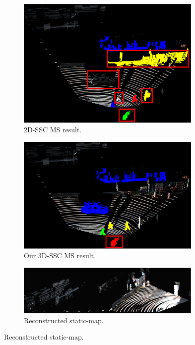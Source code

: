 \documentclass[10pt,twocolumn,letterpaper]{article}  %
\begin{document}
\begin{figure}
\vspace{-3mm}
  \centering
	\begin{subfigure}{0.333\textwidth}
  	\centering
 	\includegraphics[height=0.17\textheight, width=0.98\textwidth]{image/train_MS2d_marked.eps}
  	\caption{2D-SSC MS result.}
  	\label{fig:train_MS2d_marked}
	\end{subfigure}%
	\begin{subfigure}{0.333\textwidth}
 	\centering
  	\includegraphics[height=0.17\textheight, width=0.98\textwidth]{image/train_MS3D_marked.eps}
  	\caption{Our 3D-SSC MS result.}
  	\label{fig:train_MS3D_marked} 
  	\end{subfigure}%
  	\begin{subfigure}{0.334\textwidth}
 	\centering
  	\includegraphics[height=0.17\textheight, width=0.98\textwidth]{image/train_static_view2_bright.eps}%
  	\caption{Reconstructed static-map.}
  	\label{fig:train_static_view2} 
  	\end{subfigure}%
  	

\end{figure}
\end{document}
